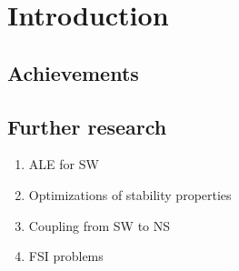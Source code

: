 
\chapter{Introduction}
\label{conclusions}




\section{Achievements}





\section{Further research}


\begin{enumerate}
    \item ALE for SW
    \item Optimizations of stability properties
    \item Coupling from SW to NS
    \item FSI problems
\end{enumerate}

